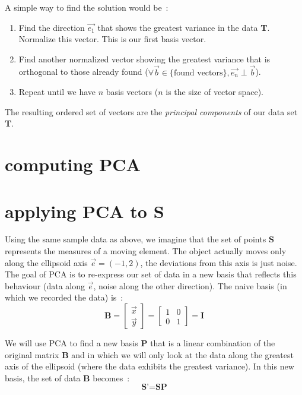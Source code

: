 \documentclass[11pt,twocolumn]{amsart} %
\begin{document}
A simple way to find the solution would be~:
\begin{enumerate}
  \item Find the direction $\vec{e_1}$ that shows the greatest variance in the data \textbf{T}. Normalize this vector. This is our first basis vector.
  \item Find another normalized vector showing the greatest variance that is orthogonal to those already found ($\forall \vec{b}\in \{\text{found vectors}\}, \vec{e_n} \perp \vec{b}$).
  \item Repeat until we have $n$ basis vectors ($n$ is the size of vector space).
\end{enumerate}

The resulting ordered set of vectors are the \emph{principal components} of our data set \textbf{T}.

\section{computing PCA}



\section{applying PCA to \textbf{S}}

Using the same sample data as above, we imagine that the set of points $\textbf{S}$ represents the measures of a moving element. The object actually moves only along the ellipsoid axis $\vec{e} = (-1,2)$, the deviations from this axis is just noise. The goal of PCA is to re-express our set of data in a new basis that reflects this behaviour (data along $\vec{e}$, noise along the other direction). The naive basis (in which we recorded the data) is~:
\begin{equation*}
  \textbf{B} = \begin{bmatrix} \vec{x} \\ \vec{y} \end{bmatrix} = \begin{bmatrix} 1 & 0 \\ 0 & 1 \end{bmatrix} = \textbf{I}
\end{equation*}

We will use PCA to find a new basis $\textbf{P}$ that is a linear combination of the original matrix $\textbf{B}$ and in which we will only look at the data along the greatest axis of the ellipsoid (where the data exhibits the greatest variance). In this new basis, the set of data \textbf{B} becomes~:
\begin{equation*}
  \textbf{S'} = \textbf{S}\textbf{P}
\end{equation*}
\end{document}
